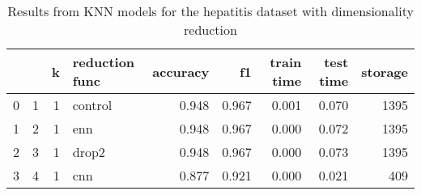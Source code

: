 \begin{table}
\centering
\caption{Results from KNN models for the hepatitis dataset with dimensionality reduction}
\begin{tabular}{lrrlrrrrr}
\toprule
 &  & k & reduction func & accuracy & f1 & train time & test time & storage \\
\midrule
0 & 1 & 1 & control & 0.948 & 0.967 & 0.001 & 0.070 & 1395 \\
1 & 2 & 1 & enn & 0.948 & 0.967 & 0.000 & 0.072 & 1395 \\
2 & 3 & 1 & drop2 & 0.948 & 0.967 & 0.000 & 0.073 & 1395 \\
3 & 4 & 1 & cnn & 0.877 & 0.921 & 0.000 & 0.021 & 409 \\
\bottomrule
\end{tabular}
\end{table}
